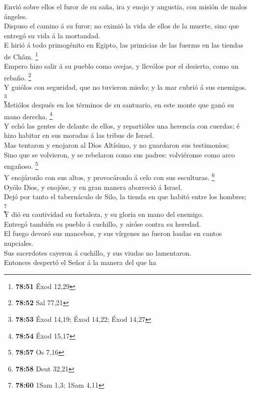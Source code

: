  Envió sobre ellos el furor de su saña, ira y enojo y
angustia, con misión de malos ángeles.\\
 Dispuso el camino á su furor; no eximió la vida de ellos
de la muerte, sino que entregó su vida á la mortandad.\\
 E hirió á todo primogénito en Egipto, las primicias de
las fuerzas en las tiendas de Châm. \footnote{\textbf{78:51} Éxod 12,29}\\
 Empero hizo salir á su pueblo como ovejas, y llevólos
por el desierto, como un rebaño. \footnote{\textbf{78:52} Sal 77,21}\\
 Y guiólos con seguridad, que no tuvieron miedo; y la mar
cubrió á sus enemigos. \footnote{\textbf{78:53} Éxod 14,19; Éxod 14,22;
  Éxod 14,27}\\
 Metiólos después en los términos de su santuario, en
este monte que ganó su mano derecha. \footnote{\textbf{78:54} Éxod 15,17}\\
 Y echó las gentes de delante de ellos, y repartióles una
herencia con cuerdas; é hizo habitar en sus moradas á las tribus de
Israel.\\
 Mas tentaron y enojaron al Dios Altísimo, y no guardaron
sus testimonios;\\
 Sino que se volvieron, y se rebelaron como sus padres:
volviéronse como arco engañoso. \footnote{\textbf{78:57} Os 7,16}\\
 Y enojáronlo con sus altos, y provocáronlo á celo con
sus esculturas. \footnote{\textbf{78:58} Deut 32,21}\\
 Oyólo Dios, y enojóse, y en gran manera aborreció á
Israel.\\
 Dejó por tanto el tabernáculo de Silo, la tienda en que
habitó entre los hombres; \footnote{\textbf{78:60} 1Sam 1,3; 1Sam 4,11}\\
 Y dió en cautividad su fortaleza, y su gloria en mano
del enemigo.\\
 Entregó también su pueblo á cuchillo, y airóse contra su
heredad.\\
 El fuego devoró sus mancebos, y sus vírgenes no fueron
loadas en cantos nupciales.\\
 Sus sacerdotes cayeron á cuchillo, y sus viudas no
lamentaron.\\
 Entonces despertó el Señor á la manera del que ha
